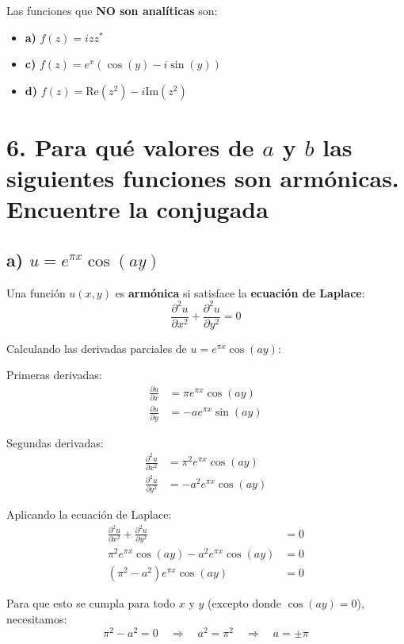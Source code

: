 \documentclass{article}
\begin{document}
Las funciones que \textbf{NO son analíticas} son:
\begin{itemize}
\item \textbf{a)} $f(z) = izz^*$
\item \textbf{c)} $f(z) = e^x(\cos(y) - i\sin(y))$
\item \textbf{d)} $f(z) = \text{Re}(z^2) - i\text{Im}(z^2)$
\end{itemize}

\newpage
\section*{6. Para qué valores de $a$ y $b$ las siguientes funciones son armónicas. Encuentre la conjugada}

\subsection*{a) $u = e^{\pi x}\cos(ay)$}

Una función $u(x,y)$ es \textbf{armónica} si satisface la \textbf{ecuación de Laplace}:
$$\frac{\partial^2 u}{\partial x^2} + \frac{\partial^2 u}{\partial y^2} = 0$$

Calculando las derivadas parciales de $u = e^{\pi x}\cos(ay)$:

Primeras derivadas:
\begin{align*}
\frac{\partial u}{\partial x} &= \pi e^{\pi x}\cos(ay) \\
\frac{\partial u}{\partial y} &= -a e^{\pi x}\sin(ay)
\end{align*}

Segundas derivadas:
\begin{align*}
\frac{\partial^2 u}{\partial x^2} &= \pi^2 e^{\pi x}\cos(ay) \\
\frac{\partial^2 u}{\partial y^2} &= -a^2 e^{\pi x}\cos(ay)
\end{align*}

Aplicando la ecuación de Laplace:
\begin{align*}
\frac{\partial^2 u}{\partial x^2} + \frac{\partial^2 u}{\partial y^2} &= 0 \\
\pi^2 e^{\pi x}\cos(ay) - a^2 e^{\pi x}\cos(ay) &= 0 \\
(\pi^2 - a^2) e^{\pi x}\cos(ay) &= 0
\end{align*}

Para que esto se cumpla para todo $x$ y $y$ (excepto donde $\cos(ay) = 0$), necesitamos:
$$\pi^2 - a^2 = 0 \quad \Rightarrow \quad a^2 = \pi^2 \quad \Rightarrow \quad a = \pm \pi$$
\end{document}
